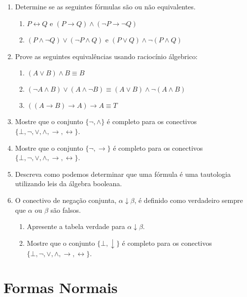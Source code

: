 \begin{enumerate}
        \item Determine se as seguintes f\'ormulas s\~ao ou n\~ao
          equivalentes.
         \begin{enumerate}
		\item $P\leftrightarrow Q$ e $(P\rightarrow Q)\land(\neg P\rightarrow \neg Q)$
		\item $(P\land\neg Q)\lor (\neg P\land Q)$ e $(P\lor Q)\land\neg(P\land Q)$
          \end{enumerate}
	\item Prove as seguintes equival\^encias usando racioc\'inio \'algebrico:
	\begin{enumerate}
		\item $(A\lor B)\land B\equiv B$
		\item $(\neg A\land B)\lor (A\land\neg B)\equiv (A\lor B)\land \neg (A\land B)$
		\item $((A\rightarrow B)\rightarrow A)\rightarrow A\equiv T$
	\end{enumerate}
        \item Mostre que o conjunto $\{\neg,\land\}$ é completo para
          os conectivos
          $\{\bot,\neg,\lor,\land,\to,\leftrightarrow\}$.
        \item Mostre que o conjunto $\{\neg,\to\}$ é completo para os
          conectivos $\{\bot,\neg,\lor,\land,\to,\leftrightarrow\}$.
        \item Descreva como podemos determinar que uma fórmula é uma
          tautologia utilizando leis da álgebra booleana.
        \item O conectivo de negação conjunta,
          $\alpha\downarrow\beta$, é definido como verdadeiro sempre
          que $\alpha$ ou $\beta$ são falsos.
         \begin{enumerate}
              \item Apresente a tabela verdade para
                $\alpha\downarrow\beta$.
              \item Mostre que o conjunto $\{\bot,\downarrow\}$ é completo
                para os conectivos $\{\bot,\neg,\lor,\land,\to,\leftrightarrow\}$.
         \end{enumerate}
\end{enumerate}


\section{Formas Normais}

